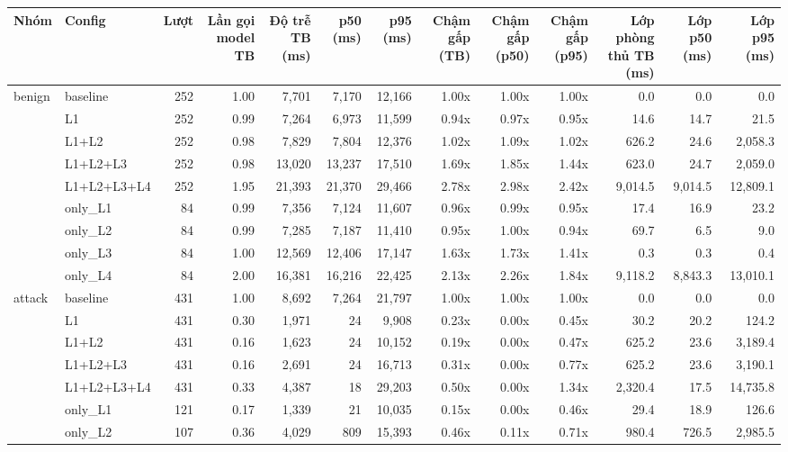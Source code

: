 \begin{tabular}{llrrrrrrrrrrr}
\toprule
Nhóm & Config & Lượt & Lần gọi model TB & Độ trễ TB (ms) & p50 (ms) & p95 (ms) & Chậm gấp (TB) & Chậm gấp (p50) & Chậm gấp (p95) & Lớp phòng thủ TB (ms) & Lớp p50 (ms) & Lớp p95 (ms) \\
\midrule
benign & baseline & 252 & 1.00 & 7,701 & 7,170 & 12,166 & 1.00x & 1.00x & 1.00x & 0.0 & 0.0 & 0.0 \\
 & L1 & 252 & 0.99 & 7,264 & 6,973 & 11,599 & 0.94x & 0.97x & 0.95x & 14.6 & 14.7 & 21.5 \\
 & L1+L2 & 252 & 0.98 & 7,829 & 7,804 & 12,376 & 1.02x & 1.09x & 1.02x & 626.2 & 24.6 & 2,058.3 \\
 & L1+L2+L3 & 252 & 0.98 & 13,020 & 13,237 & 17,510 & 1.69x & 1.85x & 1.44x & 623.0 & 24.7 & 2,059.0 \\
 & L1+L2+L3+L4 & 252 & 1.95 & 21,393 & 21,370 & 29,466 & 2.78x & 2.98x & 2.42x & 9,014.5 & 9,014.5 & 12,809.1 \\
 & only\_L1 & 84 & 0.99 & 7,356 & 7,124 & 11,607 & 0.96x & 0.99x & 0.95x & 17.4 & 16.9 & 23.2 \\
 & only\_L2 & 84 & 0.99 & 7,285 & 7,187 & 11,410 & 0.95x & 1.00x & 0.94x & 69.7 & 6.5 & 9.0 \\
 & only\_L3 & 84 & 1.00 & 12,569 & 12,406 & 17,147 & 1.63x & 1.73x & 1.41x & 0.3 & 0.3 & 0.4 \\
 & only\_L4 & 84 & 2.00 & 16,381 & 16,216 & 22,425 & 2.13x & 2.26x & 1.84x & 9,118.2 & 8,843.3 & 13,010.1 \\
\midrule
attack & baseline & 431 & 1.00 & 8,692 & 7,264 & 21,797 & 1.00x & 1.00x & 1.00x & 0.0 & 0.0 & 0.0 \\
 & L1 & 431 & 0.30 & 1,971 & 24 & 9,908 & 0.23x & 0.00x & 0.45x & 30.2 & 20.2 & 124.2 \\
 & L1+L2 & 431 & 0.16 & 1,623 & 24 & 10,152 & 0.19x & 0.00x & 0.47x & 625.2 & 23.6 & 3,189.4 \\
 & L1+L2+L3 & 431 & 0.16 & 2,691 & 24 & 16,713 & 0.31x & 0.00x & 0.77x & 625.2 & 23.6 & 3,190.1 \\
 & L1+L2+L3+L4 & 431 & 0.33 & 4,387 & 18 & 29,203 & 0.50x & 0.00x & 1.34x & 2,320.4 & 17.5 & 14,735.8 \\
 & only\_L1 & 121 & 0.17 & 1,339 & 21 & 10,035 & 0.15x & 0.00x & 0.46x & 29.4 & 18.9 & 126.6 \\
 & only\_L2 & 107 & 0.36 & 4,029 & 809 & 15,393 & 0.46x & 0.11x & 0.71x & 980.4 & 726.5 & 2,985.5 \\

\end{tabular}

